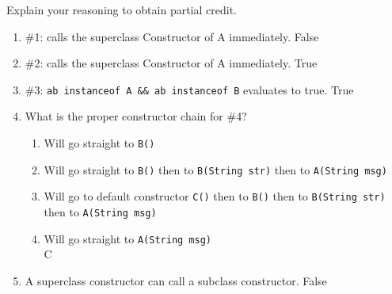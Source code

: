 \Instructions 
  Explain your reasoning to obtain partial credit.
\begin{enumerate}

Consider the following code for questions 1, 2, 3 and 4
\begin{lstlisting}
class A {
	public A(String msg) { }
}

class B extends A {
	public B() {
		this("Hello World"); /* #1 */
	}

	public B(String str) {
		super(str); /* #2 */
	}
}

class C extends B {
}

class Main {
	public static void main(String[] args) {
		A ab = new B(); /* #3 */
		C c = new C(); /* #4 */
	}
}
\end{lstlisting}

\item {} \tf \#1: calls the superclass Constructor of A immediately. \Ans False

\vspace{2em}
\item {} \tf \#2: calls the superclass Constructor of A immediately. \Ans True

\vspace{2em}
\item {} \tf \#3: \texttt{ab instanceof A \&\& ab instanceof B} evaluates to true. \Ans True

\vspace{2em}
\item {} What is the proper constructor chain for \#4?
\begin{enumerate}
\item Will go straight to \texttt{B()}
\item Will go straight to \texttt{B()} then to \texttt{B(String str)} then to \texttt{A(String msg)}
\item Will go to default constructor \texttt{C()} then to \texttt{B()} then to \texttt{B(String str)} then to \texttt{A(String msg)}
\item Will go straight to \texttt{A(String msg)}\\
\Ans C
\end{enumerate}

\vspace{2em}
\item {} \tf A superclass constructor can call a subclass constructor. \Ans False




\end{enumerate}  